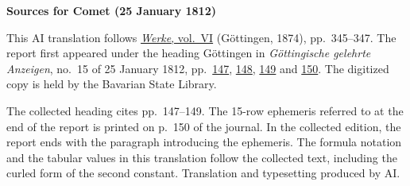 \clearpage\thispagestyle{empty}
\begin{center}\textbf{Sources for Comet (25 January 1812)}\end{center}
\noindent This AI translation follows \href{https://gdz.sub.uni-goettingen.de/id/PPN236007467}{\textit{Werke}, vol.~VI} (Göttingen, 1874), pp.~345--347. The report first appeared under the heading Göttingen in \textit{Göttingische gelehrte Anzeigen}, no.~15 of 25 January 1812, pp.~\href{https://api.digitale-sammlungen.de/iiif/image/v2/bsb10538681_00191/full/1600,/0/default.jpg}{147}, \href{https://api.digitale-sammlungen.de/iiif/image/v2/bsb10538681_00192/full/1600,/0/default.jpg}{148}, \href{https://api.digitale-sammlungen.de/iiif/image/v2/bsb10538681_00193/full/1600,/0/default.jpg}{149} and \href{https://api.digitale-sammlungen.de/iiif/image/v2/bsb10538681_00194/full/1600,/0/default.jpg}{150}. The digitized copy is held by the Bavarian State Library.
\par\smallskip\noindent The collected heading cites pp.~147--149. The 15-row ephemeris referred to at the end of the report is printed on p.~150 of the journal. In the collected edition, the report ends with the paragraph introducing the ephemeris. The formula notation and the tabular values in this translation follow the collected text, including the curled form of the second constant. Translation and typesetting produced by AI.
\clearpage
